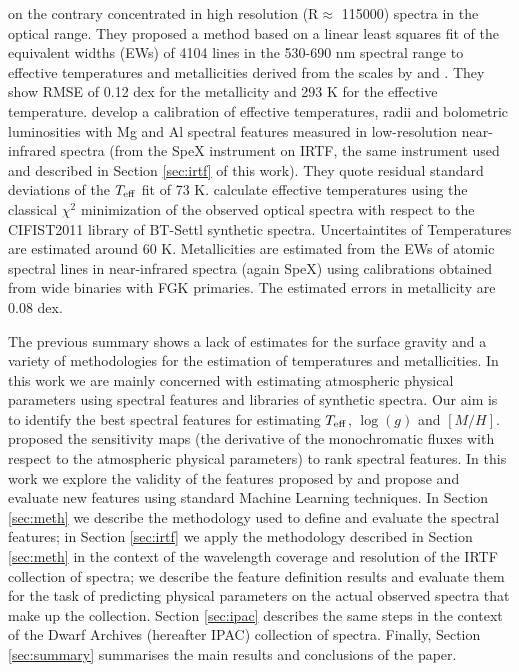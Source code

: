 \cite{2014A&A...568A.121N} on the contrary concentrated in
high resolution (R$\approx$ 115000) spectra in the optical range.
They proposed a method based on a linear least squares fit of the
equivalent widths (EWs) of 4104 lines in the 530-690 nm spectral range
to effective temperatures and metallicities derived from the scales
by \cite{2012A&A...538A..25N} and \cite{2008MNRAS.389..585C}. 
They show RMSE of 0.12 dex for the metallicity and 293 K for the effective
temperature. \cite{2015ApJ...800...85N} develop a calibration of
effective temperatures, radii and bolometric luminosities with Mg and
Al spectral features measured in low-resolution near-infrared spectra
(from the SpeX instrument on IRTF, the same instrument used and
described in Section \ref{sec:irtf} of this work). 
They quote residual
standard deviations of the $T_{\rm eff}$ fit of 73 K. \cite{Mann2015}
calculate effective temperatures using the classical $\chi^2$
minimization of the observed optical spectra with respect to the
CIFIST2011 library of BT-Settl synthetic spectra. 
Uncertaintites of Temperatures are estimated around 60 K. 
Metallicities are estimated from the EWs of
atomic spectral lines in near-infrared spectra (again SpeX) using
calibrations obtained from wide binaries with FGK primaries. The
estimated errors in metallicity are 0.08 dex. 

The previous summary shows a lack of estimates for the surface gravity
and a variety of methodologies for the estimation of temperatures and
metallicities. In this work we are mainly concerned with estimating
atmospheric physical parameters using spectral features and libraries
of synthetic spectra. Our aim is to identify the best spectral
features for estimating $T_{\rm eff}$, $\log(g)$ and
$[M/H]$. \cite{cesetti} proposed the sensitivity maps (the derivative
of the monochromatic fluxes with respect to the atmospheric physical
parameters) to rank spectral features. In this work we explore the
validity of the features proposed by \cite{cesetti} and propose and
evaluate new features using standard Machine Learning techniques. In
Section \ref{sec:meth} we describe the methodology used to define and
evaluate the spectral features; in Section \ref{sec:irtf} we apply the
methodology described in Section \ref{sec:meth} in the context of the
wavelength coverage and resolution of the IRTF collection of spectra;
we describe the feature definition results and evaluate them for the
task of predicting physical parameters on the actual observed spectra
that make up the collection. Section \ref{sec:ipac} describes the same
steps in the context of the Dwarf Archives (hereafter IPAC) collection
of spectra. Finally, Section \ref{sec:summary} summarises the main
results and conclusions of the paper.
